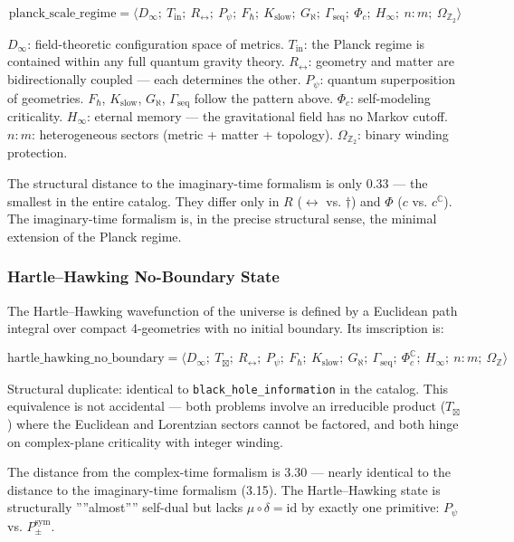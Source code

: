 \documentclass[12pt,a4paper]{article}
\begin{document}
\[\text{planck\_scale\_regime} = \langle D_{\infty};\ T_{\text{in}};\ R_{\leftrightarrow};\ P_{\psi};\ F_{\hbar};\ K_{\text{slow}};\ G_{\aleph};\ \Gamma_{\text{seq}};\ \Phi_c;\ H_{\infty};\ n{:}m;\ \Omega_{\mathbb{Z}_2} \rangle\]

$D_{\infty}$: field-theoretic configuration space of metrics. $T_{\text{in}}$: the Planck regime is contained within any full quantum gravity theory. $R_{\leftrightarrow}$: geometry and matter are bidirectionally coupled --- each determines the other. $P_{\psi}$: quantum superposition of geometries. $F_{\hbar}$, $K_{\text{slow}}$, $G_{\aleph}$, $\Gamma_{\text{seq}}$ follow the pattern above. $\Phi_c$: self-modeling criticality. $H_{\infty}$: eternal memory --- the gravitational field has no Markov cutoff. $n{:}m$: heterogeneous sectors (metric + matter + topology). $\Omega_{\mathbb{Z}_2}$: binary winding protection.

The structural distance to the imaginary-time formalism is only 0.33 --- the smallest in the entire catalog. They differ only in $R$ ($\leftrightarrow$ vs. $\dagger$) and $\Phi$ ($c$ vs. $c^\mathbb{C}$). The imaginary-time formalism is, in the precise structural sense, the minimal extension of the Planck regime.

\subsubsection{Hartle--Hawking No-Boundary State}

The Hartle--Hawking wavefunction of the universe is defined by a Euclidean path integral over compact 4-geometries with no initial boundary. Its imscription is:

\[\text{hartle\_hawking\_no\_boundary} = \langle D_{\infty};\ T_{\boxtimes};\ R_{\leftrightarrow};\ P_{\psi};\ F_{\hbar};\ K_{\text{slow}};\ G_{\aleph};\ \Gamma_{\text{seq}};\ \Phi_c^\mathbb{C};\ H_{\infty};\ n{:}m;\ \Omega_\mathbb{Z} \rangle\]

Structural duplicate: identical to \texttt{black\_hole\_information} in the catalog. This equivalence is not accidental --- both problems involve an irreducible product ($T_{\boxtimes}$) where the Euclidean and Lorentzian sectors cannot be factored, and both hinge on complex-plane criticality with integer winding.

The distance from the complex-time formalism is 3.30 --- nearly identical to the distance to the imaginary-time formalism (3.15). The Hartle--Hawking state is structurally ''''almost'''' self-dual but lacks $\mu \circ \delta = \text{id}$ by exactly one primitive: $P_{\psi}$ vs. $P_{\pm}^{\text{sym}}$.
\end{document}
